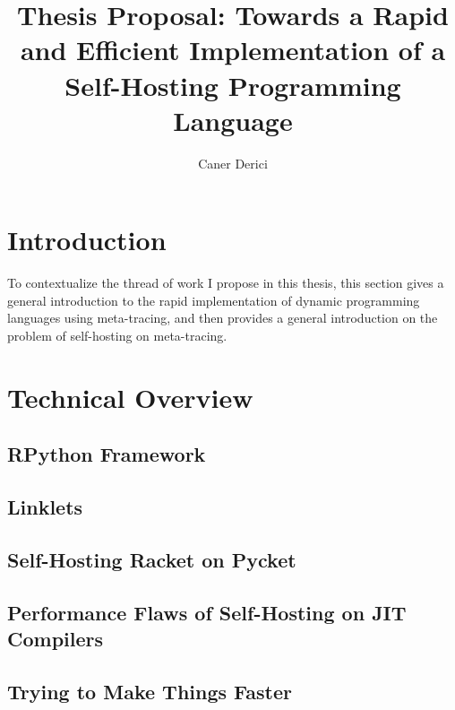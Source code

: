 \documentclass[9pt]{extarticle}
\title{Thesis Proposal: Towards a Rapid and Efficient Implementation
  of a Self-Hosting Programming Language}
\author{Caner Derici}
\begin{document}


\maketitle

\begin{abstract}
\end{abstract}

\section{Introduction}

To contextualize the thread of work I propose in this thesis, this
section gives a general introduction to the rapid implementation of
dynamic programming languages using meta-tracing, and then provides a
general introduction on the problem of self-hosting on meta-tracing.




\section{Technical Overview}

%

%

%

\subsection{RPython Framework}

\subsection{Linklets}

\subsection{Self-Hosting Racket on Pycket}

\subsection{Performance Flaws of Self-Hosting on JIT Compilers}

\subsection{Trying to Make Things Faster}
\end{document}
